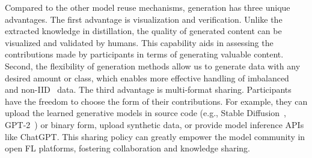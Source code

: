 Compared to the other model reuse mechanisms, generation has three unique advantages.
The first advantage is visualization and verification. Unlike the extracted knowledge in distillation, the quality of generated content can be visualized and validated by humans. 
This capability aids in assessing the contributions made by participants in terms of generating valuable content.
Second, the flexibility of generation methods allow us to generate data with any desired amount or class, which enables more effective handling of imbalanced~\cite{chawla2002smote} and non-IID~\cite{zhang2022fine} data.
The third advantage is multi-format sharing. Participants have the freedom to choose the form of their contributions. For example, they can upload the learned generative models in source code (e.g., Stable Diffusion~\cite{rombach2022high}, GPT-2~\cite{radford2019language}) or binary form, upload synthetic data, or provide model inference APIs like ChatGPT.
This sharing policy can greatly empower the model community in open FL platforms, fostering collaboration and knowledge sharing.

